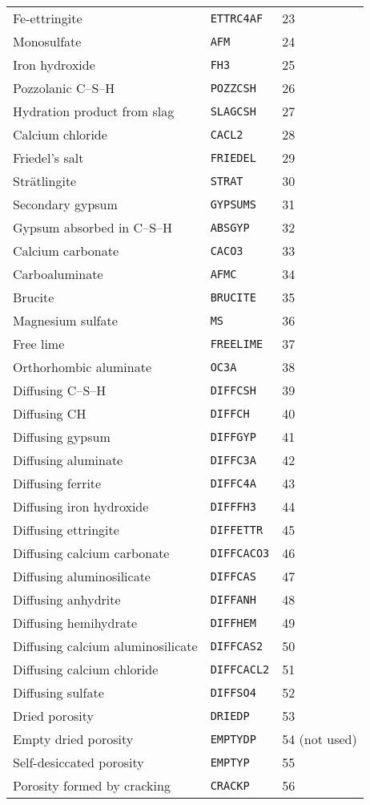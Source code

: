 \documentclass[12pt]{article}
\begin{document}
\begin{center}
\begin{supertabular}{lll}
    Fe-ettringite & \texttt{ETTRC4AF} & 23 \\
    Monosulfate & \texttt{AFM} & 24 \\
    Iron hydroxide & \texttt{FH3} & 25 \\
    Pozzolanic C--S--H & \texttt{POZZCSH} & 26 \\
    Hydration product from slag & \texttt{SLAGCSH} & 27 \\
    Calcium chloride & \texttt{CACL2} & 28 \\
    Friedel's salt & \texttt{FRIEDEL} & 29 \\
    Str{\"{a}}tlingite & \texttt{STRAT} & 30 \\
    Secondary gypsum & \texttt{GYPSUMS} & 31 \\
    Gypsum absorbed in C--S--H & \texttt{ABSGYP} & 32 \\
    Calcium carbonate & \texttt{CACO3} & 33 \\
    Carboaluminate & \texttt{AFMC} & 34 \\
    Brucite & \texttt{BRUCITE} & 35 \\
    Magnesium sulfate & \texttt{MS} & 36 \\
    Free lime & \texttt{FREELIME} & 37 \\
    Orthorhombic aluminate & \texttt{OC3A} & 38 \\
    Diffusing C--S--H & \texttt{DIFFCSH} & 39 \\
    Diffusing CH & \texttt{DIFFCH} & 40 \\
    Diffusing gypsum & \texttt{DIFFGYP} & 41 \\
    Diffusing aluminate & \texttt{DIFFC3A} & 42 \\
    Diffusing ferrite & \texttt{DIFFC4A} & 43 \\
    Diffusing iron hydroxide & \texttt{DIFFFH3} & 44 \\
    Diffusing ettringite & \texttt{DIFFETTR} & 45 \\
    Diffusing calcium carbonate & \texttt{DIFFCACO3} & 46 \\
    Diffusing aluminosilicate & \texttt{DIFFCAS} & 47 \\
    Diffusing anhydrite & \texttt{DIFFANH} & 48 \\
    Diffusing hemihydrate & \texttt{DIFFHEM} & 49 \\
    Diffusing calcium aluminosilicate & \texttt{DIFFCAS2} & 50 \\
    Diffusing calcium chloride & \texttt{DIFFCACL2} & 51 \\
    Diffusing sulfate & \texttt{DIFFSO4} & 52 \\
    Dried porosity & \texttt{DRIEDP} & 53 \\
    Empty dried porosity & \texttt{EMPTYDP} & 54 (not used) \\
    Self-desiccated porosity & \texttt{EMPTYP} & 55 \\
    Porosity formed by cracking & \texttt{CRACKP} & 56 \\ \bottomrule
\end{supertabular}
\end{center}
\end{document}
